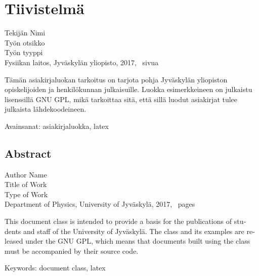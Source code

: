 \documentclass[final, finnished, monochromatic]{jyuthesis}
\newcommand \jyuauthor{Author Name}
\newcommand \jyuauthorfinnish{Tekijän Nimi}
\newcommand \jyutitle{Title of Work}
\newcommand \jyutitlefinnish{Työn otsikko}
\newcommand \jyupublication{Type of Work}
\newcommand \jyupublicationfinnish{Työn tyyppi}
\newcommand \jyuinstitute{University of Jyväskylä}
\newcommand \jyuinstitutefinnish{Jyväskylän yliopisto}
\newcommand \jyudepartment{Department of Physics}
\newcommand \jyudepartmentfinnish{Fysiikan laitos}
\newcommand \jyuyear{2017}
\begin{document}
\maketitle

\section*{Tiivistelmä}

\begin{raggedright}
  \jyuauthorfinnish \\
  \jyutitlefinnish \\
  \jyupublicationfinnish \\
  \jyudepartmentfinnish, \jyuinstitutefinnish, \jyuyear,
  \pageref{p/lastpage}~sivua
\end{raggedright}

\bigskip

\noindent
Tämän asiakirjaluokan tarkoitus on tarjota pohja
Jyväskylän yliopiston opiskelijoiden ja henkilökunnan julkaisuille.
Luokka esimerkkeineen on julkaistu lisenssillä GNU GPL, mikä tarkoittaa sitä,
että sillä luodut asiakirjat tulee julkaista lähdekoodeineen.

\bigskip

\begin{raggedright}
  Avainsanat: asiakirjaluokka, latex
\end{raggedright}

\begin{otherlanguage}{english}

\section*{Abstract}

\begin{raggedright}
  \jyuauthor \\
  \jyutitle \\
  \jyupublication \\
  \jyudepartment, \jyuinstitute, \jyuyear,
  \pageref{p/lastpage}~pages
\end{raggedright}

\bigskip

\noindent
This document class is intended to provide a basis
for the publications of students and staff of the University of Jyväskylä.
The class and its examples are released under the GNU GPL, which means that
documents built using the class must be accompanied by their source code.

\bigskip

\begin{raggedright}
  Keywords: document class, latex
\end{raggedright}

\end{otherlanguage}
\end{document}
